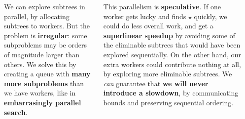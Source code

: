 \documentclass[20pt,a1paper,landscape]{tikzposter}
\begin{document}
\begin{columns}
{\begin{center}
\end{center}

    We can explore subtrees in parallel, by allocating subtrees to workers. But the problem is
    \textbf{irregular}: some subproblems may be orders of magnitude larger than others.  We solve
    this by creating a queue with \textbf{many more subproblems} than we have workers, like in
    \textbf{embarrasingly parallel search}.

    \bigskip

    This parallelism is \textbf{speculative}. If one worker gets lucky and finds $\star$ quickly, we
    could do less overall work, and get a \textbf{superlinear speedup} by avoiding some of the
    eliminable subtrees that would have been explored sequentially. On the other hand, our extra
    workers could contribute nothing at all, by exploring more eliminable subtrees. We \emph{can}
    guarantee that \textbf{we will never introduce a slowdown}, by communicating bounds and
    preserving sequential ordering.
}


\end{columns}
\end{document}
